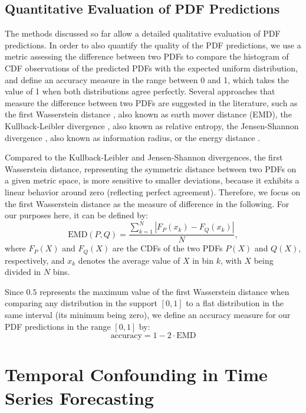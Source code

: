 \documentclass[BCOR=1mm, DIV=calc,10pt,
twoside=true,
twocolumn,
headings=normal]{scrartcl}
\begin{document}
\subsection{Quantitative Evaluation of PDF Predictions}
\label{sec:cdf_acc}

The methods discussed so far allow a detailed qualitative evaluation of PDF predictions. In order to also quantify the quality of the PDF predictions, we use a metric assessing the difference between two PDFs to compare the histogram of CDF observations of the predicted PDFs with the expected uniform distribution, and define an accuracy measure in the range between 0 and 1, which takes the value of 1 when both distributions agree perfectly. Several approaches that measure the difference between two PDFs are suggested in the literature, such as the first Wasserstein distance \cite{olkin1982}, also known as earth mover distance (EMD), the Kullback-Leibler divergence \cite{kullback1951}, also known as relative entropy, the Jensen-Shannon divergence \cite{dagan1997}, also known as information radius, or the energy distance \cite{SZEKELY20131249}.

Compared to the Kullback-Leibler and Jensen-Shannon divergences, the first Wasserstein distance, representing the symmetric distance between two PDFs on a given metric space, is more sensitive to smaller deviations, because it exhibits a linear behavior around zero (reflecting perfect agreement). Therefore, we focus on the first Wasserstein distance as the measure of difference in the following. For our purposes here, it can be defined by:
\begin{equation}
\text{EMD}(P, Q) = \frac{\sum_{k=1}^N |F_P(x_k) - F_Q(x_k)|}{N},
\end{equation}
where $F_P(X)$ and $F_Q(X)$ are the CDFs of the two PDFs $P(X)$ and $Q(X)$, respectively, and $x_k$ denotes the average value of $X$ in bin $k$, with $X$ being divided in $N$ bins.

Since $0.5$ represents the maximum value of the first Wasserstein distance when comparing any distribution in the support $[0, 1]$ to a flat distribution in the same interval (its minimum being zero), we define an accuracy measure for our PDF predictions in the range $[0, 1]$ by:
\begin{equation}
\text{accuracy} = 1 - 2 \cdot \text{EMD}
\end{equation}


\section{Temporal Confounding in Time Series Forecasting}
\label{sec:ts_confounding}
\end{document}
